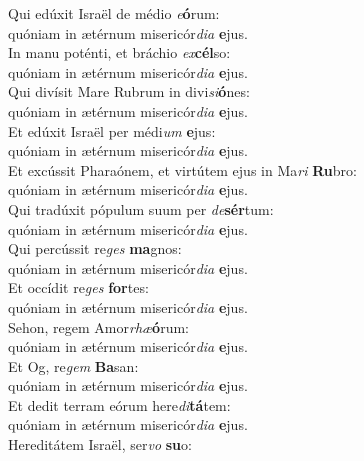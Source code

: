\evenverse Qui edúxit Israël de médio \textit{e}\textbf{ó}rum:~\*\\
\evenverse quóniam in ætérnum misericór\textit{di}\textit{a} \textbf{e}jus.\\
\oddverse In manu poténti, et bráchio \textit{ex}\textbf{cél}so:~\*\\
\oddverse quóniam in ætérnum misericór\textit{di}\textit{a} \textbf{e}jus.\\
\evenverse Qui divísit Mare Rubrum in divi\textit{si}\textbf{ó}nes:~\*\\
\evenverse quóniam in ætérnum misericór\textit{di}\textit{a} \textbf{e}jus.\\
\oddverse Et edúxit Israël per médi\textit{um} \textbf{e}jus:~\*\\
\oddverse quóniam in ætérnum misericór\textit{di}\textit{a} \textbf{e}jus.\\
\evenverse Et excússit Pharaónem, et virtútem ejus in Ma\textit{ri} \textbf{Ru}bro:~\*\\
\evenverse quóniam in ætérnum misericór\textit{di}\textit{a} \textbf{e}jus.\\
\oddverse Qui tradúxit pópulum suum per \textit{de}\textbf{sér}tum:~\*\\
\oddverse quóniam in ætérnum misericór\textit{di}\textit{a} \textbf{e}jus.\\
\evenverse Qui percússit re\textit{ges} \textbf{ma}gnos:~\*\\
\evenverse quóniam in ætérnum misericór\textit{di}\textit{a} \textbf{e}jus.\\
\oddverse Et occídit re\textit{ges} \textbf{for}tes:~\*\\
\oddverse quóniam in ætérnum misericór\textit{di}\textit{a} \textbf{e}jus.\\
\evenverse Sehon, regem Amor\textit{rhæ}\textbf{ó}rum:~\*\\
\evenverse quóniam in ætérnum misericór\textit{di}\textit{a} \textbf{e}jus.\\
\oddverse Et Og, re\textit{gem} \textbf{Ba}san:~\*\\
\oddverse quóniam in ætérnum misericór\textit{di}\textit{a} \textbf{e}jus.\\
\evenverse Et dedit terram eórum here\textit{di}\textbf{tá}tem:~\*\\
\evenverse quóniam in ætérnum misericór\textit{di}\textit{a} \textbf{e}jus.\\
\oddverse Hereditátem Israël, ser\textit{vo} \textbf{su}o:~\*\\
